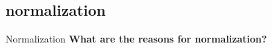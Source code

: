 \documentclass{beamer}
\begin{document}

\subsection[normalization]{normalization}

\begin{frame}{Normalization}
  \textbf{What are the reasons for normalization?}

\end{frame}    



%     
% 
%     
\end{document}
